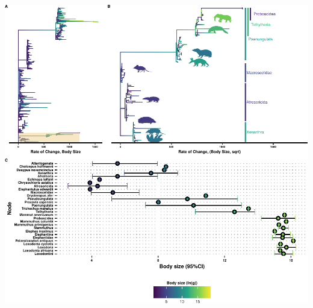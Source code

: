 \documentclass[]{elsarticle} %
\let\origfigure\figure
\let\endorigfigure\endfigure
\renewenvironment{figure}[1][2] {
    \expandafter\origfigure\expandafter[H]
} {
    \endorigfigure
}
\begin{document}
\begin{figure}[H]
\includegraphics[width=6in,]{paper_PLOS_draft_files/figure-latex/Figure-BodySize-1} \caption{Body sizes rapidly and frequently expand in Eutherians, especially in Atlantogenata. **A)** Tree of Eutherian species, colored by ln(Body Size) and with branch lengths set to the rate of change in body sizes, normalized by the square root of the root branch. Atlantogenata is highlighted at the bottom. **B)** Zoom-in of (**A**) on Atlantogenata. Silhuetes for the African Elephant, West Indian Manatee, Cape Elephant Shrew, Lesser Hedgehog Tenrec, Cape Golden Mole, Nine-Banded Armadillo, and Hoffman's Two-Toed Sloth are colored by their extant body sizes, while clade labels are colored based on the common ancestor's estimated body size. **C)** Confidence interval plot for representative species and ancestral nodes.}\label{fig:Figure-BodySize}
\end{figure}
\end{document}
